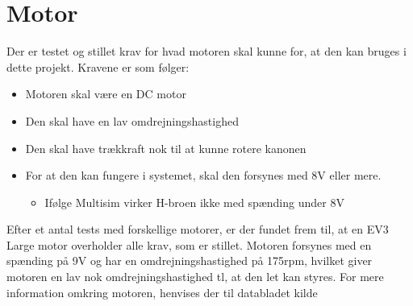 \section{Motor}
Der er testet og stillet krav for hvad motoren skal kunne for, at den kan bruges i dette projekt. 
Kravene er som følger:
	\begin{itemize}
		\item	Motoren skal være en DC motor
		\item   Den skal have en lav omdrejningshastighed
		\item	Den skal have trækkraft nok til at kunne rotere kanonen
		\item	For at den kan fungere i systemet, skal den forsynes med 8V eller mere.
		\begin{itemize}
			\item Ifølge Multisim virker H-broen ikke med spænding under 8V
		\end{itemize}
	\end{itemize}
Efter et antal tests med forskellige motorer, er der fundet frem til, at en EV3 Large motor \cite{legoMotor} overholder alle krav, som er stillet. Motoren forsynes med en spænding på 9V og har en omdrejningshastighed på 175rpm, hvilket giver motoren en lav nok omdrejningshastighed tl, at den let kan styres. For mere information omkring motoren, henvises der til databladet kilde \cite{legoMotor}
